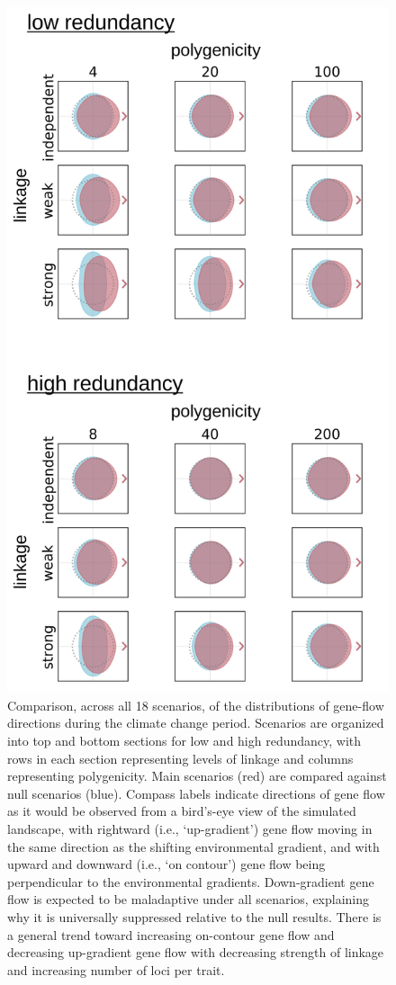 \documentclass[9pt,twocolumn,twoside,lineno]{pnas-new}
\begin{document}
\begin{figure}
\centering
\includegraphics[width=.8\linewidth]{pub/figs/FIG_2_gene_flow.jpg}
    \caption{Comparison, across all 18 scenarios, of the distributions of gene-flow directions during the climate change period. Scenarios are organized into top and bottom sections for low and high redundancy, with rows in each section representing levels of linkage and columns representing polygenicity. Main scenarios (red) are compared against null scenarios (blue). Compass labels indicate directions of gene flow as it would be observed from a bird’s-eye view of the simulated landscape, with rightward (i.e., `up-gradient') gene flow moving in the same direction as the shifting environmental gradient, and with upward and downward (i.e., `on contour’) gene flow being perpendicular to the environmental gradients. Down-gradient gene flow is expected to be maladaptive under all scenarios, explaining why it is universally suppressed relative to the null results. There is a general trend toward increasing on-contour gene flow and decreasing up-gradient gene flow with decreasing strength of linkage and increasing number of loci per trait.
}
\label{fig:fig_2}
\end{figure}
\end{document}

